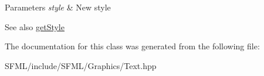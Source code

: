 \begin{DoxyParams}{Parameters}
{\em style} & New style\\
\hline
\end{DoxyParams}
\begin{DoxySeeAlso}{See also}
\mbox{\hyperlink{classsf_1_1_text_a0da79b0c057f4bb51592465a205c35d7}{get\+Style}} \begin{DoxyVerb}\end{DoxyVerb}
 
\end{DoxySeeAlso}


The documentation for this class was generated from the following file\+:\begin{DoxyCompactItemize}
\item 
S\+F\+M\+L/include/\+S\+F\+M\+L/\+Graphics/Text.\+hpp\end{DoxyCompactItemize}
